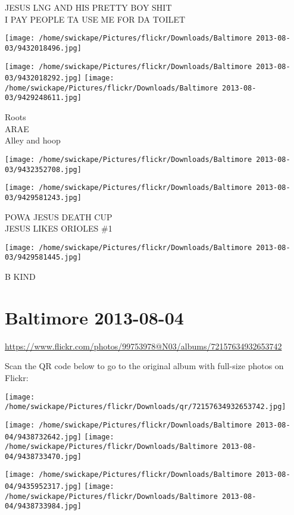 \documentclass[10pt,letterpaper]{article}
\begin{document}
JESUS LNG AND HIS PRETTY BOY SHIT\\
I PAY PEOPLE TA USE ME FOR DA TOILET
\pagebreak

\texttt{[image: /home/swickape/Pictures/flickr/Downloads/Baltimore 2013-08-03/9432018496.jpg]}

\vspace{0.25in}
\texttt{[image: /home/swickape/Pictures/flickr/Downloads/Baltimore 2013-08-03/9432018292.jpg]}
\texttt{[image: /home/swickape/Pictures/flickr/Downloads/Baltimore 2013-08-03/9429248611.jpg]}

Roots\\
ARAE\\
Alley and hoop
\pagebreak

\texttt{[image: /home/swickape/Pictures/flickr/Downloads/Baltimore 2013-08-03/9432352708.jpg]}

\vspace{0.25in}
\texttt{[image: /home/swickape/Pictures/flickr/Downloads/Baltimore 2013-08-03/9429581243.jpg]}

POWA JESUS DEATH CUP\\
JESUS LIKES ORIOLES \#1
\pagebreak

\texttt{[image: /home/swickape/Pictures/flickr/Downloads/Baltimore 2013-08-03/9429581445.jpg]}

B KIND
\pagebreak

\section*{Baltimore 2013-08-04}

\url{https://www.flickr.com/photos/99753978@N03/albums/72157634932653742}

Scan the QR code below to go to the original album with full-size photos on Flickr:

\texttt{[image: /home/swickape/Pictures/flickr/Downloads/qr/72157634932653742.jpg]}
\pagebreak

\texttt{[image: /home/swickape/Pictures/flickr/Downloads/Baltimore 2013-08-04/9438732642.jpg]}
\texttt{[image: /home/swickape/Pictures/flickr/Downloads/Baltimore 2013-08-04/9438733470.jpg]}

\texttt{[image: /home/swickape/Pictures/flickr/Downloads/Baltimore 2013-08-04/9435952317.jpg]}
\texttt{[image: /home/swickape/Pictures/flickr/Downloads/Baltimore 2013-08-04/9438733984.jpg]}
\end{document}
